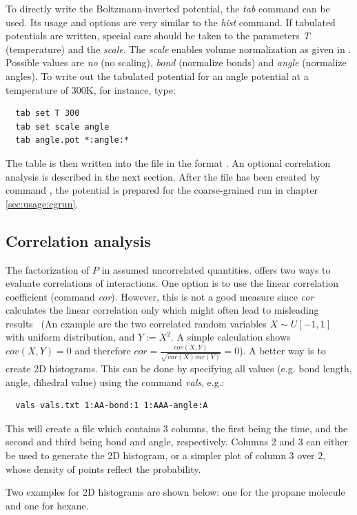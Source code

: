 To directly write the Boltzmann-inverted potential, the \textit{tab} command can be used. Its usage and options are very similar to the \textit{hist} command. If tabulated potentials are written, special care should be taken to the parameters \textit{T} (temperature) and the \textit{scale}. The \textit{scale} enables volume normalization as given in . Possible values are \textit{no} (no scaling), \textit{bond} (normalize bonds) and \textit{angle} (normalize angles). To write out the tabulated potential for an angle potential at a temperature of 300K, for instance, type:
\begin{verbatim}
  tab set T 300
  tab set scale angle
  tab angle.pot *:angle:*
\end{verbatim}
The table is then written into the file  in the format \todo. An optional correlation analysis is described in the next section. After the file has been created by command , the potential is prepared for the coarse-grained run in chapter \ref{sec:usage:cgrun}.

\subsection{Correlation analysis}
The factorization of $P$ in  assumed uncorrelated quantities.  offers two ways to evaluate correlations of interactions. One option is to use the linear correlation coefficient (command \textit{cor}). However, this is not a good measure since \textit{cor} calculates the linear correlation only which might often lead to misleading results~\cite{Ruehle:2009.a} (An example are the two correlated random variables $X \sim U[-1,1]$ with uniform distribution, and $Y:=X^2$. A simple calculation shows $cov(X,Y)=0$ and therefore $cor=\frac{cov(X,Y)}{\sqrt{var(X)var(Y)}}=0$). A better way is to create 2D histograms. This can be done by specifying all values (e.g. bond length, angle, dihedral value) using the command \textit{vals}, e.g.:
\begin{verbatim}
  vals vals.txt 1:AA-bond:1 1:AAA-angle:A
\end{verbatim}
This will create a file which contains 3 columns, the first being the time, and the second and third being bond and angle, respectively. Columns 2 and 3 can either be used to generate the 2D histogram, or a simpler plot of column 3 over 2, whose density of points reflect the probability.

Two examples for 2D histograms are shown below: one for the propane molecule and one for hexane.

